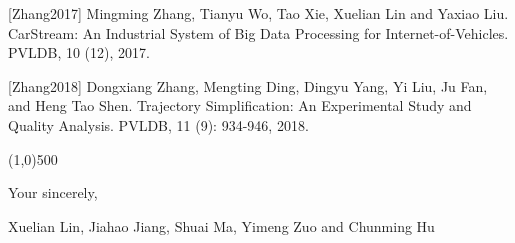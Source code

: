 \documentclass{letter}
\begin{document}
[Zhang2017] Mingming Zhang, Tianyu Wo, Tao Xie, Xuelian Lin and Yaxiao Liu. CarStream: An Industrial System of Big Data Processing for Internet-of-Vehicles. PVLDB, 10 (12), 2017.

[Zhang2018] Dongxiang Zhang, Mengting Ding, Dingyu Yang, Yi Liu, Ju Fan, and Heng Tao Shen. Trajectory Simplification: An Experimental Study and Quality Analysis. PVLDB, 11 (9): 934-946, 2018.

\line(1,0){500}



Your sincerely,

Xuelian Lin, Jiahao Jiang, Shuai Ma, Yimeng Zuo and Chunming Hu



%
%
\end{document}
